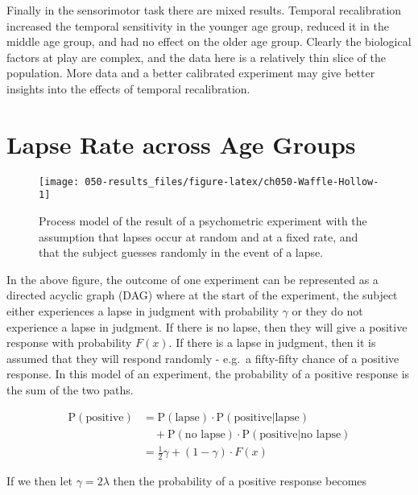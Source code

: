 \documentclass[11pt, oneside, openany]{scrbook}
\begin{document}
Finally in the sensorimotor task there are mixed results. Temporal recalibration increased the temporal sensitivity in the younger age group, reduced it in the middle age group, and had no effect on the older age group. Clearly the biological factors at play are complex, and the data here is a relatively thin slice of the population. More data and a better calibrated experiment may give better insights into the effects of temporal recalibration.

\hypertarget{lapse-rate-across-age-groups}{%
\section{Lapse Rate across Age Groups}\label{lapse-rate-across-age-groups}}

\begin{figure}

{\centering \texttt{[image: 050-results\_files/figure-latex/ch050-Waffle-Hollow-1]} 

}

\caption{Process model of the result of a psychometric experiment with the assumption that lapses occur at random and at a fixed rate, and that the subject guesses randomly in the event of a lapse.}\label{fig:ch050-Waffle-Hollow}
\end{figure}

In the above figure, the outcome of one experiment can be represented as a directed acyclic graph (DAG) where at the start of the experiment, the subject either experiences a lapse in judgment with probability \(\gamma\) or they do not experience a lapse in judgment. If there is no lapse, then they will give a positive response with probability \(F(x)\). If there is a lapse in judgment, then it is assumed that they will respond randomly - e.g.~a fifty-fifty chance of a positive response. In this model of an experiment, the probability of a positive response is the sum of the two paths.

\begin{align*}
\mathrm{P}(\textrm{positive}) &= 
  \mathrm{P}(\textrm{lapse}) \cdot \mathrm{P}(\textrm{positive} | \textrm{lapse}) \\
  &\quad + \mathrm{P}(\textrm{no lapse}) \cdot \mathrm{P}(\textrm{positive} | \textrm{no lapse}) \\
  &= \frac{1}{2} \gamma + (1 - \gamma) \cdot F(x)
\end{align*}

If we then let \(\gamma = 2\lambda\) then the probability of a positive response becomes
\end{document}
